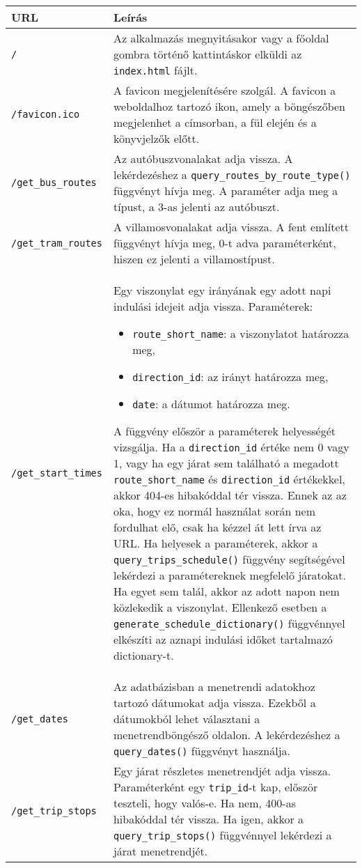 \begin{longtable}{|p{4.5cm}|p{9cm}|}
\hline
\textbf{URL} & \textbf{Leírás} \\
\hline
\texttt{/} &
Az alkalmazás megnyitásakor vagy a főoldal gombra történő kattintáskor elküldi az \texttt{index.html} fájlt. \\
\hline
\texttt{/favicon.ico} &
A favicon megjelenítésére szolgál. A favicon a weboldalhoz tartozó ikon, amely a böngészőben megjelenhet a címsorban, a fül elején és a könyvjelzők előtt. \\
\hline
\texttt{/get\_bus\_routes} &
Az autóbuszvonalakat adja vissza. A lekérdezéshez a \texttt{query\_routes\_by\_route\_type()} függvényt hívja meg. A paraméter adja meg a típust, a 3-as jelenti az autóbuszt. \\
\hline
\texttt{/get\_tram\_routes} &
A villamosvonalakat adja vissza. A fent említett függvényt hívja meg, 0-t adva paraméterként, hiszen ez jelenti a villamostípust. \\
\hline
\texttt{/get\_start\_times} &
Egy viszonylat egy irányának egy adott napi indulási idejeit adja vissza.
Paraméterek:
\begin{itemize}
\item \texttt{route\_short\_name}: a viszonylatot határozza meg,
\item \texttt{direction\_id}: az irányt határozza meg,
\item \texttt{date}: a dátumot határozza meg.
\end{itemize}
A függvény először a paraméterek helyességét vizsgálja. Ha a \texttt{direction\_id} értéke nem 0 vagy 1, vagy ha egy járat sem található a megadott \texttt{route\_short\_name} és \texttt{direction\_id} értékekkel, akkor 404-es hibakóddal tér vissza. Ennek az az oka, hogy ez normál használat során nem fordulhat elő, csak ha kézzel át lett írva az URL.
Ha helyesek a paraméterek, akkor a \texttt{query\_trips\_schedule()} függvény segítségével lekérdezi a paramétereknek megfelelő járatokat. Ha egyet sem talál, akkor az adott napon nem közlekedik a viszonylat. Ellenkező esetben a \texttt{generate\_schedule\_dictionary()}  függvénnyel elkészíti az aznapi indulási időket tartalmazó dictionary-t. \\
\hline
\texttt{/get\_dates} &
Az adatbázisban a menetrendi adatokhoz tartozó dátumokat adja vissza. Ezekből a dátumokból lehet választani a menetrendböngésző oldalon. A lekérdezéshez a \texttt{query\_dates()} függvényt használja.  \\
\hline
\texttt{/get\_trip\_stops} &
Egy járat részletes menetrendjét adja vissza. Paraméterként egy \texttt{trip\_id}-t kap, először teszteli, hogy valós-e. Ha nem, 400-as hibakóddal tér vissza. Ha igen, akkor a \texttt{query\_trip\_stops()} függvénnyel lekérdezi a járat menetrendjét.  \\

\end{longtable}
